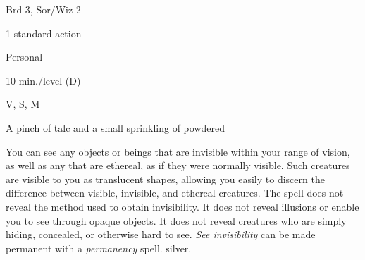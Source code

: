 
\begin{description*}
\item[Level:] Brd 3, Sor/Wiz 2
\item[Casting Time:] 1 standard action
\item[Range:] Personal
\item[Duration:] 10 min./level (D)
\item[Components:] V, S, M
\item[Arcane Material Component:] A pinch of talc and a small sprinkling of powdered
\end{description*}

You can see any objects or beings that are invisible within your range of vision,
as well as any that are ethereal, as if they were normally visible. Such creatures
are visible to you as translucent shapes, allowing you easily to discern the difference
between visible, invisible, and ethereal creatures.
The spell does not reveal the method used to obtain invisibility. It does not reveal
illusions or enable you to see through opaque objects. It does not reveal creatures
who are simply hiding, concealed, or otherwise hard to see.
\textit{See invisibility} can be made permanent with a \textit{permanency} spell.
silver.